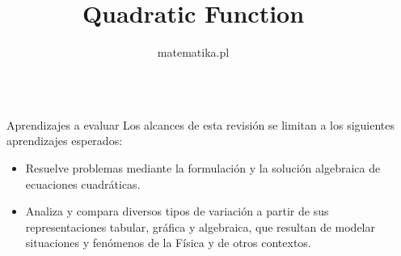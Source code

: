 \documentclass[final]{beamer}
\title{Quadratic Function} %
\author{matematika.pl} %
\institute{2015} %
\newlength{\sepwid}
\newlength{\onecolwid}
\begin{document}

\setlength{\belowcaptionskip}{2ex} %
\setlength\belowdisplayshortskip{2ex} %

\begin{frame}[t] %

    \begin{columns}[t] %

        \begin{column}{\sepwid}\end{column} %

        \begin{column}{\onecolwid} %


            \begin{alertblock}{Aprendizajes a evaluar}
                Los alcances de esta revisión se limitan a los siguientes aprendizajes esperados:
                \begin{itemize}
                    \item Resuelve problemas mediante la formulación y la solución algebraica de ecuaciones cuadráticas.
                    \item Analiza y compara diversos tipos de variación a partir de sus representaciones tabular, gráfica y algebraica, que resultan de modelar situaciones y fenómenos de la Física y de otros contextos.
                \end{itemize}

            \end{alertblock}


            

            

        \end{column} %


\end{columns}
\end{frame}
\end{document}
